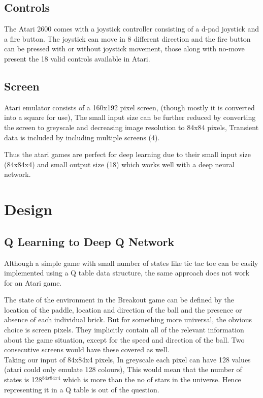 \documentclass[twoside,letterpaper]{article}
\begin{document}
{\subsection{Controls}
The Atari 2600 comes with a joystick controller consisting of a d-pad joystick and a fire button. The joystick can move in 8 different direction and the fire button can be pressed with or without joystick movement, those along with no-move present the 18 valid controls available in Atari.

\subsection{Screen}
Atari emulator consists of a 160x192 pixel screen, (though mostly it is converted into a square for use), The small input size can be further reduced by converting the screen to greyscale and decreasing image resolution to 84x84 pixels, Transient data is included by including multiple screens (4). 

Thus the atari games are perfect for deep learning due to their small input size (84x84x4) and small output size (18) which works well with a deep neural network.

\section{Design}
\subsection{Q Learning to Deep Q Network}
Although a simple game with small number of states like tic tac toe can be easily implemented using a Q table data structure, the same approach does not work for an Atari game.

The state of the environment in the Breakout game can be defined by the location of the paddle, location and direction of the ball and the presence or absence of each individual brick. But for something more universal, the obvious choice is screen pixels. They implicitly contain all of the relevant information about the game situation, except for the speed and direction of the ball. Two consecutive screens would have these covered as well.\\

Taking our input of 84x84x4 pixels, In greyscale each pixel can have 128 values (atari could only emulate 128 colours), This would mean that the number of states is 128$^{84x84x4}$ which is more than the no of stars in the universe. Hence representing it in a Q table is out of the question.

}
\end{document}
